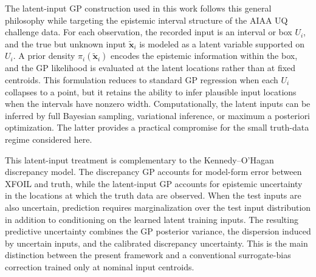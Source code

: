 \documentclass[journal]{new-aiaa}
\newcommand{\x}{\mathbf{x}}
\begin{document}
The latent-input GP construction used in this work follows this general philosophy while targeting the epistemic interval structure of the AIAA UQ challenge data. For each observation, the recorded input is an interval or box $U_i$, and the true but unknown input $\tilde{\x}_i$ is modeled as a latent variable supported on $U_i$. A prior density $\pi_i(\tilde{\x}_i)$ encodes the epistemic information within the box, and the GP likelihood is evaluated at the latent locations rather than at fixed centroids. This formulation reduces to standard GP regression when each $U_i$ collapses to a point, but it retains the ability to infer plausible input locations when the intervals have nonzero width. Computationally, the latent inputs can be inferred by full Bayesian sampling, variational inference, or maximum a posteriori optimization. The latter provides a practical compromise for the small truth-data regime considered here.

This latent-input treatment is complementary to the Kennedy--O'Hagan discrepancy model. The discrepancy GP accounts for model-form error between XFOIL and truth, while the latent-input GP accounts for epistemic uncertainty in the locations at which the truth data are observed. When the test inputs are also uncertain, prediction requires marginalization over the test input distribution in addition to conditioning on the learned latent training inputs. The resulting predictive uncertainty combines the GP posterior variance, the dispersion induced by uncertain inputs, and the calibrated discrepancy uncertainty. This is the main distinction between the present framework and a conventional surrogate-bias correction trained only at nominal input centroids.
\end{document}
